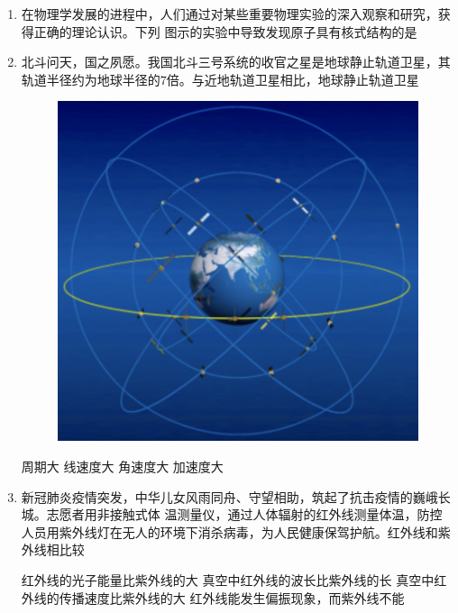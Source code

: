 




\begin{enumerate}
\item
在物理学发展的进程中，人们通过对某些重要物理实验的深入观察和研究，获得正确的理论认识。下列
图示的实验中导致发现原子具有核式结构的是  
\pfourchoices
{}
{}
{}
{}






\item
北斗问天，国之夙愿。我国北斗三号系统的收官之星是地球静止轨道卫星，其轨道半径约为地球半径的$ 7 $倍。与近地轨道卫星相比，地球静止轨道卫星  
\begin{figure}[h!]
\centering
\includegraphics[width=0.2\linewidth]{picture/screenshot053}
\end{figure}


\fourchoices
{周期大}
{线速度大}
{角速度大}
{加速度大}




\item
新冠肺炎疫情突发，中华儿女风雨同舟、守望相助，筑起了抗击疫情的巍峨长城。志愿者用非接触式体
温测量仪，通过人体辐射的红外线测量体温，防控人员用紫外线灯在无人的环境下消杀病毒，为人民健康保驾护航。红外线和紫外线相比较  

\fourchoices
{红外线的光子能量比紫外线的大}
{真空中红外线的波长比紫外线的长}
{真空中红外线的传播速度比紫外线的大}
{红外线能发生偏振现象，而紫外线不能}


\end{enumerate}
